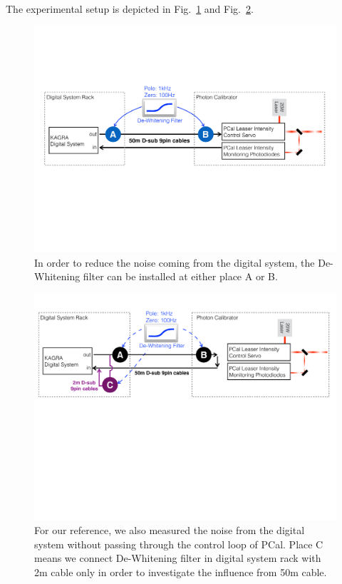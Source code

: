 The experimental setup is depicted in Fig.~\ref{fig:dew_setup} and Fig.~\ref{fig:dew_setup2m}.\\

\begin{figure}[hbt!]
\centering
\includegraphics[width=1\textwidth]{figure/dew_setup.pdf}
\caption[setup]{In order to reduce the noise coming from the digital system, the De-Whitening filter can be installed at either place A or B.    }
\label{fig:dew_setup}
\end{figure}

\begin{figure}[hbt!]
\centering
\includegraphics[width=1\textwidth]{figure/dew_setup2m.pdf}
\caption[setup]{For our reference, we also measured the noise from the digital system without passing through the control loop of PCal. Place C means we connect De-Whitening filter in digital system rack with 2m cable only in order to investigate the influence from 50m cable.}
\label{fig:dew_setup2m}
\end{figure}


